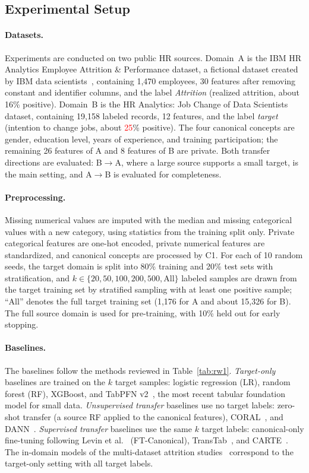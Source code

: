 \documentclass[runningheads]{llncs}
\newcommand{\tbd}[1]{\textcolor{red}{#1}}
\begin{document}
\subsection{Experimental Setup}
\paragraph{Datasets.} Experiments are conducted on two public HR sources. Domain~A is the IBM HR Analytics Employee Attrition \& Performance dataset, a fictional dataset created by IBM data scientists~\cite{alali2026}, containing 1,470 employees, 30 features after removing constant and identifier columns, and the label \emph{Attrition} (realized attrition, about 16\% positive). Domain~B is the HR Analytics: Job Change of Data Scientists dataset, containing 19,158 labeled records, 12 features, and the label \emph{target} (intention to change jobs, about \tbd{25}\% positive). The four canonical concepts are gender, education level, years of experience, and training participation; the remaining 26 features of A and 8 features of B are private. Both transfer directions are evaluated: B$\to$A, where a large source supports a small target, is the main setting, and A$\to$B is evaluated for completeness.

\paragraph{Preprocessing.} Missing numerical values are imputed with the median and missing categorical values with a new category, using statistics from the training split only. Private categorical features are one-hot encoded, private numerical features are standardized, and canonical concepts are processed by C1. For each of 10 random seeds, the target domain is split into 80\% training and 20\% test sets with stratification, and $k\in\{20,50,100,200,500,\text{All}\}$ labeled samples are drawn from the target training set by stratified sampling with at least one positive sample; ``All'' denotes the full target training set (1,176 for A and about 15,326 for B). The full source domain is used for pre-training, with 10\% held out for early stopping.

\paragraph{Baselines.} The baselines follow the methods reviewed in Table~\ref{tab:rw1}. \emph{Target-only} baselines are trained on the $k$ target samples: logistic regression (LR), random forest (RF), XGBoost, and TabPFN v2~\cite{hollmann2025}, the most recent tabular foundation model for small data. \emph{Unsupervised transfer} baselines use no target labels: zero-shot transfer (a source RF applied to the canonical features), CORAL~\cite{sun2016}, and DANN~\cite{ganin2015}. \emph{Supervised transfer} baselines use the same $k$ target labels: canonical-only fine-tuning following Levin et al.~\cite{levin2023} (FT-Canonical), TransTab~\cite{wang2022}, and CARTE~\cite{kim2024}. The in-domain models of the multi-dataset attrition studies~\cite{baydili2025,alali2026} correspond to the target-only setting with all target labels.
\end{document}
